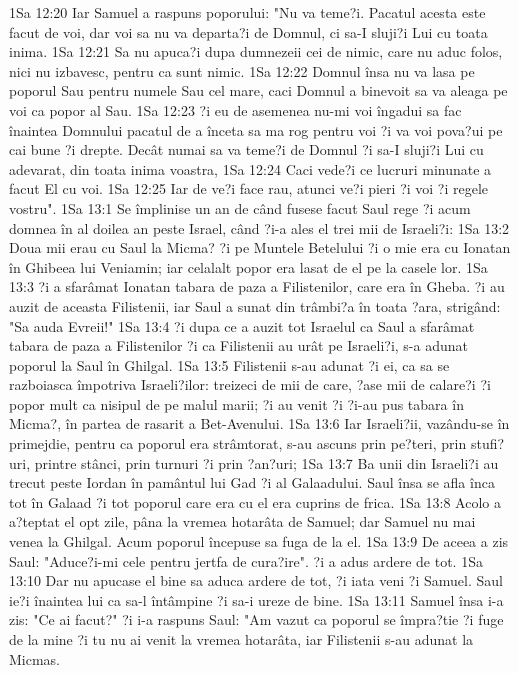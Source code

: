 1Sa 12:20  Iar Samuel a raspuns poporului: "Nu va teme?i. Pacatul acesta este facut de voi, dar voi sa nu va departa?i de Domnul, ci sa-I sluji?i Lui cu toata inima.
1Sa 12:21  Sa nu apuca?i dupa dumnezeii cei de nimic, care nu aduc folos, nici nu izbavesc, pentru ca sunt nimic.
1Sa 12:22  Domnul însa nu va lasa pe poporul Sau pentru numele Sau cel mare, caci Domnul a binevoit sa va aleaga pe voi ca popor al Sau.
1Sa 12:23  ?i eu de asemenea nu-mi voi îngadui sa fac înaintea Domnului pacatul de a înceta sa ma rog pentru voi ?i va voi pova?ui pe cai bune ?i drepte. Decât numai sa va teme?i de Domnul ?i sa-I sluji?i Lui cu adevarat, din toata inima voastra,
1Sa 12:24  Caci vede?i ce lucruri minunate a facut El cu voi.
1Sa 12:25  Iar de ve?i face rau, atunci ve?i pieri ?i voi ?i regele vostru".
1Sa 13:1  Se împlinise un an de când fusese facut Saul rege ?i acum domnea în al doilea an peste Israel, când ?i-a ales el trei mii de Israeli?i:
1Sa 13:2  Doua mii erau cu Saul la Micma? ?i pe Muntele Betelului ?i o mie era cu Ionatan în Ghibeea lui Veniamin; iar celalalt popor era lasat de el pe la casele lor.
1Sa 13:3  ?i a sfarâmat Ionatan tabara de paza a Filistenilor, care era în Gheba. ?i au auzit de aceasta Filistenii, iar Saul a sunat din trâmbi?a în toata ?ara, strigând: "Sa auda Evreii!"
1Sa 13:4  ?i dupa ce a auzit tot Israelul ca Saul a sfarâmat tabara de paza a Filistenilor ?i ca Filistenii au urât pe Israeli?i, s-a adunat poporul la Saul în Ghilgal.
1Sa 13:5  Filistenii s-au adunat ?i ei, ca sa se razboiasca împotriva Israeli?ilor: treizeci de mii de care, ?ase mii de calare?i ?i popor mult ca nisipul de pe malul marii; ?i au venit ?i ?i-au pus tabara în Micma?, în partea de rasarit a Bet-Avenului.
1Sa 13:6  Iar Israeli?ii, vazându-se în primejdie, pentru ca poporul era strâmtorat, s-au ascuns prin pe?teri, prin stufi?uri, printre stânci, prin turnuri ?i prin ?an?uri;
1Sa 13:7  Ba unii din Israeli?i au trecut peste Iordan în pamântul lui Gad ?i al Galaadului. Saul însa se afla înca tot în Galaad ?i tot poporul care era cu el era cuprins de frica.
1Sa 13:8  Acolo a a?teptat el opt zile, pâna la vremea hotarâta de Samuel; dar Samuel nu mai venea la Ghilgal. Acum poporul începuse sa fuga de la el.
1Sa 13:9  De aceea a zis Saul: "Aduce?i-mi cele pentru jertfa de cura?ire". ?i a adus ardere de tot.
1Sa 13:10  Dar nu apucase el bine sa aduca ardere de tot, ?i iata veni ?i Samuel. Saul ie?i înaintea lui ca sa-l întâmpine ?i sa-i ureze de bine.
1Sa 13:11  Samuel însa i-a zis: "Ce ai facut?" ?i i-a raspuns Saul: "Am vazut ca poporul se împra?tie ?i fuge de la mine ?i tu nu ai venit la vremea hotarâta, iar Filistenii s-au adunat la Micmas.

